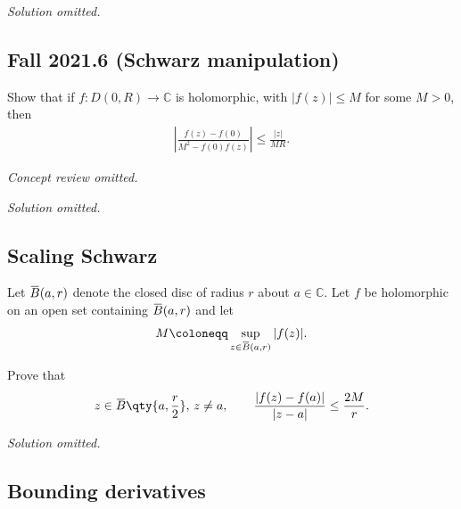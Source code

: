 \emph{Solution omitted.}

\hypertarget{fall-2021.6-schwarz-manipulation}{%
\subsection{Fall 2021.6 (Schwarz
manipulation)}\label{fall-2021.6-schwarz-manipulation}}

\begin{problem}[?]

Show that if \(f: D(0, R) \rightarrow \mathbb{C}\) is holomorphic, with
\(|f(z)| \leq M\) for some \(M>0\), then
\begin{align*}
\left|\frac{f(z)-f(0)}{M^{2}-\overline{f(0)} f(z)}\right| \leq \frac{|z|}{M R} .
\end{align*}

\end{problem}

\emph{Concept review omitted.}

\emph{Solution omitted.}

\hypertarget{scaling-schwarz}{%
\subsection{Scaling Schwarz}\label{scaling-schwarz}}

\begin{problem}[?]

Let
\(\mkern 1.5mu\overline{\mkern-1.5muB\mkern-1.5mu}\mkern 1.5mu(a, r)\)
denote the closed disc of radius \(r\) about \(a\in {\mathbb{C}}\). Let
\(f\) be holomorphic on an open set containing
\(\mkern 1.5mu\overline{\mkern-1.5muB\mkern-1.5mu}\mkern 1.5mu(a, r)\)
and let
\begin{align*}  
M \coloneqq\sup_{z\in \mkern 1.5mu\overline{\mkern-1.5muB\mkern-1.5mu}\mkern 1.5mu(a, r)} {\left\lvert {f(z)} \right\rvert}
.\end{align*}

Prove that
\begin{align*}  
z\in \mkern 1.5mu\overline{\mkern-1.5muB\mkern-1.5mu}\mkern 1.5mu\qty{a, {r\over 2}},\,z\neq a, \qquad {{\left\lvert { f(z) - f(a)} \right\rvert} \over {\left\lvert {z-a} \right\rvert}} \leq {2M \over r}
.\end{align*}

\end{problem}

\emph{Solution omitted.}

\hypertarget{bounding-derivatives}{%
\subsection{Bounding derivatives}\label{bounding-derivatives}}

